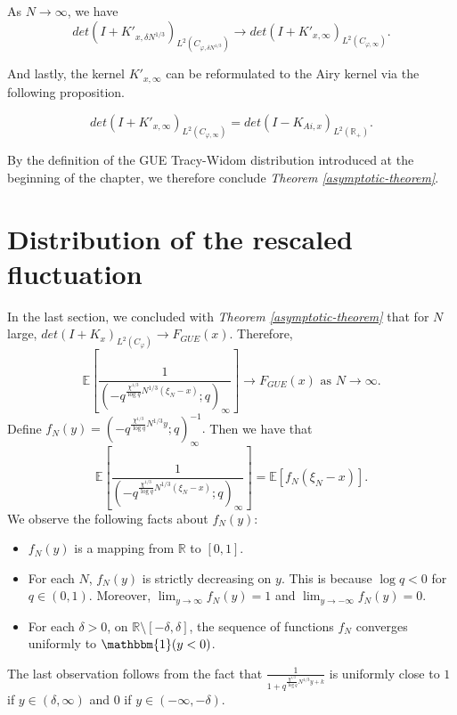 \begin{proposition} 
As $N \rightarrow \infty$, we have $$det(I+K'_{x, \delta N^{1/3}})_{L^2(C_{\varphi, \delta N^{1/3}})} \rightarrow det(I+K'_{x, \infty})_{L^2(C_{\varphi, \infty})}.$$
\end{proposition}

And lastly, the kernel $K'_{x, \infty}$ can be reformulated to the Airy kernel via the following proposition.
\begin{proposition} 

$$det(I+K'_{x,\infty})_{L^2(C_{\varphi, \infty})} = det(I - K_{Ai, x})_{L^2(\mathbb{R}_+)}.$$
\end{proposition}

By the definition of the GUE Tracy-Widom distribution introduced at the beginning of the chapter, we therefore conclude \textit{Theorem \ref{asymptotic-theorem}}.

\section{Distribution of the rescaled fluctuation}
In the last section, we concluded with \textit{Theorem \ref{asymptotic-theorem}} that for $N$ large, $det(I+K_x)_{L^2(C_{\varphi})} \rightarrow F_{GUE}(x)$. Therefore, 
\begin{equation}
\label{finale-equality}
\mathbb{E} \left[ \frac{1}{( -q^{ \frac{\chi^{1/3}}{\log q} N^{1/3} (\xi_N - x) }; q )_{\infty}} \right] \rightarrow F_{GUE}(x) \text{ as } N \rightarrow \infty.
\end{equation}
Define $f_N(y) = (-q^{\frac{\chi^{1/3}}{\log q} N^{1/3} y};q)_{\infty}^{-1}.$ Then we have that $$\mathbb{E} \left[ \frac{1}{( -q^{ \frac{\chi^{1/3}}{\log q} N^{1/3} (\xi_N - x) }; q )_{\infty}} \right] = \mathbb{E} \left[ f_N(\xi_N - x) \right].$$ We observe the following facts about $f_N(y)$:
\begin{itemize}
\item $f_N(y)$ is a mapping from $\mathbb{R}$ to $[0,1]$.
\item For each $N$, $f_N(y)$ is strictly decreasing on $y$. This is because $\log q < 0$ for $q \in (0,1)$. Moreover, $\lim_{y \rightarrow \infty} f_N(y) = 1$ and $\lim_{y \rightarrow -\infty} f_N(y) = 0$.
\item For each $\delta > 0$, on $\mathbb{R} \setminus [-\delta, \delta]$, the sequence of functions $f_N$ converges uniformly to $\mathbbm{1}(y < 0)$.
\end{itemize}
The last observation follows from the fact that $\frac{1}{1+q^{\frac{\chi^{1/3}}{\log q} N^{1/3} y + k}}$ is uniformly close to $1$ if $y \in (\delta, \infty)$ and $0$ if $y \in (-\infty, -\delta)$.

